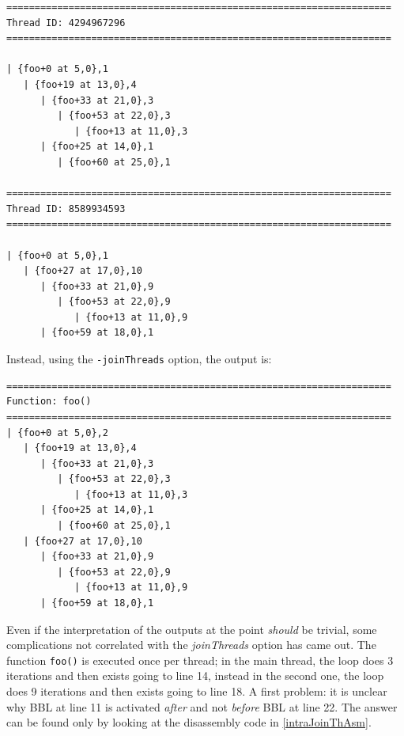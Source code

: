 \documentclass[a4paper,11pt]{report}
\begin{document}
\begin{lstlisting}[label=out11, caption={the output of IHPP analyzing \texttt{prog5}}]
====================================================================
Thread ID: 4294967296
====================================================================

| {foo+0 at 5,0},1
   | {foo+19 at 13,0},4
      | {foo+33 at 21,0},3
         | {foo+53 at 22,0},3
            | {foo+13 at 11,0},3
      | {foo+25 at 14,0},1
         | {foo+60 at 25,0},1

====================================================================
Thread ID: 8589934593
====================================================================

| {foo+0 at 5,0},1
   | {foo+27 at 17,0},10
      | {foo+33 at 21,0},9
         | {foo+53 at 22,0},9
            | {foo+13 at 11,0},9
      | {foo+59 at 18,0},1

\end{lstlisting}

\noindent
Instead, using the \verb|-joinThreads| option, the output is:

\begin{lstlisting}[label=out12, 
caption={the output of IHPP analyzing \texttt{prog5} with \texttt{-joinThreads}}]
====================================================================
Function: foo()
====================================================================
| {foo+0 at 5,0},2
   | {foo+19 at 13,0},4
      | {foo+33 at 21,0},3
         | {foo+53 at 22,0},3
            | {foo+13 at 11,0},3
      | {foo+25 at 14,0},1
         | {foo+60 at 25,0},1
   | {foo+27 at 17,0},10
      | {foo+33 at 21,0},9
         | {foo+53 at 22,0},9
            | {foo+13 at 11,0},9
      | {foo+59 at 18,0},1

\end{lstlisting}

\noindent
Even if the interpretation of the outputs at the point \emph{should} be trivial,
some complications not correlated with the \emph{joinThreads} option 
has came out.
The function \verb|foo()| is executed once per thread; in the main thread, the loop does 3 iterations and then exists going to line 14, instead
in the second one, the loop does 9 iterations and then exists going to line 18.
A first problem: it is unclear why BBL at line 11 is activated \emph{after} 
and not \emph{before} BBL at line 22. The answer can be found only by looking at
the disassembly code in \cref{intraJoinThAsm}.
\end{document}
